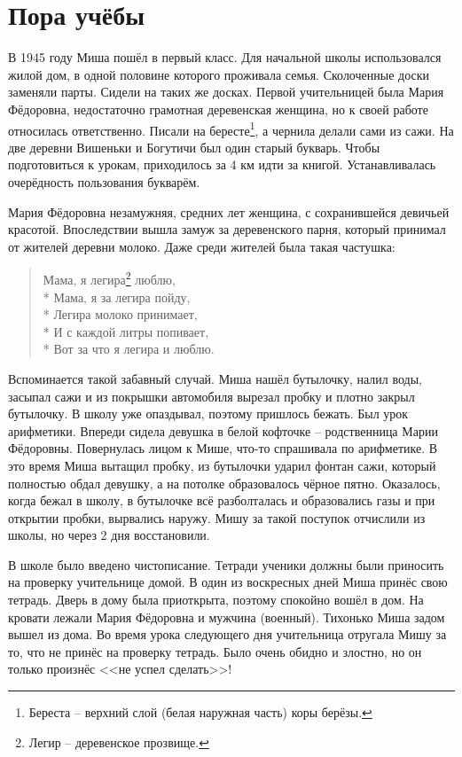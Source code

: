 ﻿\chapter{Пора учёбы}
В 1945 году Миша пошёл в первый класс. Для начальной школы использовался жилой дом, в одной половине которого проживала семья. Сколоченные доски заменяли парты. Сидели на таких же досках. Первой учительницей была Мария Фёдоровна, недостаточно грамотная деревенская женщина, но к своей работе относилась ответственно. Писали на бересте\footnote{Береста \--- верхний слой (белая наружная часть) коры берёзы.}, а чернила делали сами из сажи. На две деревни Вишеньки и Богутичи был один старый букварь. Чтобы подготовиться к урокам, приходилось за 4 км идти за книгой. Устанавливалась очерёдность пользования букварём.

Мария Фёдоровна незамужняя, средних лет женщина, с сохранившейся девичьей красотой. Впоследствии вышла замуж за деревенского парня, который принимал от жителей деревни молоко. Даже среди жителей была такая частушка:

\begin{verse}
	Мама, я легира\footnote{Легир \--- деревенское прозвище.} люблю, \\* 
	Мама, я за легира пойду, \\*	
	Легира молоко принимает, \\*
	И с каждой литры попивает, \\*
	Вот за что я легира и люблю. 
\end{verse}

Вспоминается такой забавный случай. Миша нашёл бутылочку, налил воды, засыпал сажи и из покрышки автомобиля вырезал пробку и плотно закрыл бутылочку. В школу уже опаздывал, поэтому пришлось бежать. Был урок арифметики. Впереди сидела девушка в белой кофточке \--- родственница Марии Фёдоровны. Повернулась лицом к Мише, что-то спрашивала по арифметике. В это время Миша вытащил пробку, из бутылочки ударил фонтан сажи, который полностью обдал девушку, а на потолке образовалось чёрное пятно. Оказалось, когда бежал в школу, в бутылочке всё разболталась и образовались газы и при открытии пробки, вырвались наружу. Мишу за такой поступок отчислили из школы, но через 2 дня восстановили.

В школе было введено чистописание. Тетради ученики должны были приносить на проверку учительнице домой. В один из воскресных дней Миша принёс свою тетрадь. Дверь в дому была приоткрыта, поэтому спокойно вошёл в дом. На кровати лежали Мария Фёдоровна и мужчина (военный). Тихонько Миша задом вышел из дома. Во время урока следующего дня учительница отругала Мишу за то, что не принёс на проверку тетрадь. Было очень обидно и злостно, но он только произнёс <<не успел сделать>>! 

